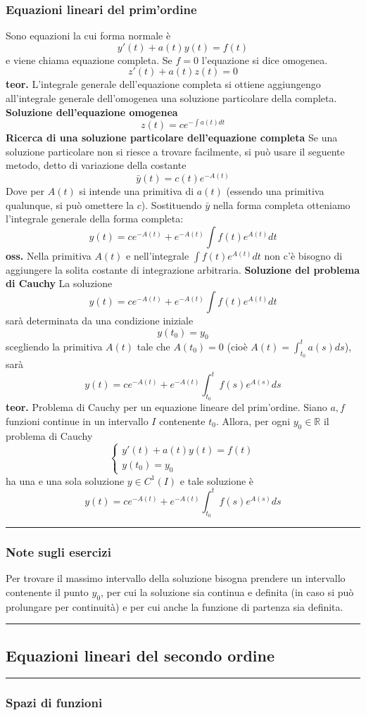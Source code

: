 \subsubsection*{Equazioni lineari del prim'ordine}
Sono equazioni la cui forma normale è
\[
    y'(t) + a(t)y(t) = f(t)
\]
e viene chiama equazione completa.\newline
Se $f = 0$ l'equazione si dice omogenea.
\[
    z'(t) + a(t)z(t) = 0
\]
\textbf{teor.} L'integrale generale dell'equazione completa si ottiene aggiungengo all'integrale generale dell'omogenea una soluzione particolare della completa.\newline
\textbf{Soluzione dell'equazione omogenea}
\[
    z(t) = c e^{-\int a(t) dt}
\]
\textbf{Ricerca di una soluzione particolare dell'equazione completa}\newline
Se una soluzione particolare non si riesce a trovare facilmente, si può usare il seguente metodo, detto di variazione della costante
\[
    \bar{y}(t) = c(t)e^{-A(t)}
\]
Dove per $A(t)$ si intende una primitiva di $a(t)$ (essendo una primitiva qualunque, si può omettere la $c$).\newline
Sostituendo $\bar{y}$ nella forma completa otteniamo l'integrale generale della forma completa:
\[
    y(t) = ce^{-A(t)} + e^{-A(t)}\int f(t)e^{A(t)}dt
\]
\textbf{oss.} Nella primitiva $A(t)$ e nell'integrale $\int f(t)e^{A(t)}dt$ non c'è bisogno di aggiungere la solita costante di integrazione arbitraria.\newline
\textbf{Soluzione del problema di Cauchy}\newline
La soluzione 
\[
    y(t) = ce^{-A(t)} + e^{-A(t)}\int f(t)e^{A(t)}dt
\]
sarà determinata da una condizione iniziale
\[
    y(t_0) = y_0
\]
scegliendo la primitiva $A(t)$ tale che $A(t_0) = 0$ (cioè $A(t) = \int_{t_0}^{t}a(s)ds$), sarà
\[
    y(t) = ce^{-A(t)} + e^{-A(t)} \int_{t_0}^{t} f(s)e^{A(s)}ds
\]
\textbf{teor.} Problema di Cauchy per un equazione lineare del prim'ordine.\newline
Siano $a, f$ funzioni continue in un intervallo $I$ contenente $t_0$. Allora, per ogni $y_0 \in \mathbb{R}$ il problema di Cauchy
\[
    \begin{cases}
        y'(t) + a(t)y(t)= f(t)\\
        y(t_0) = y_0
    \end{cases}
\]
ha una e una sola soluzione $y \in C^1(I)$ e tale soluzione è
\[
    y(t) = ce^{-A(t)} + e^{-A(t)} \int_{t_0}^{t} f(s)e^{A(s)}ds
\]
\rule{\textwidth}{0,4pt}\newline
\subsubsection*{Note sugli esercizi}
Per trovare il massimo intervallo della soluzione bisogna prendere un intervallo contenente il punto $y_0$, per cui la soluzione sia continua e definita (in caso si può prolungare per continuità) e per cui anche la funzione di partenza sia definita.\newline
\rule{\textwidth}{2pt}
\subsection*{Equazioni lineari del secondo ordine}
\rule{\textwidth}{0,4pt}
\subsubsection*{Spazi di funzioni}
